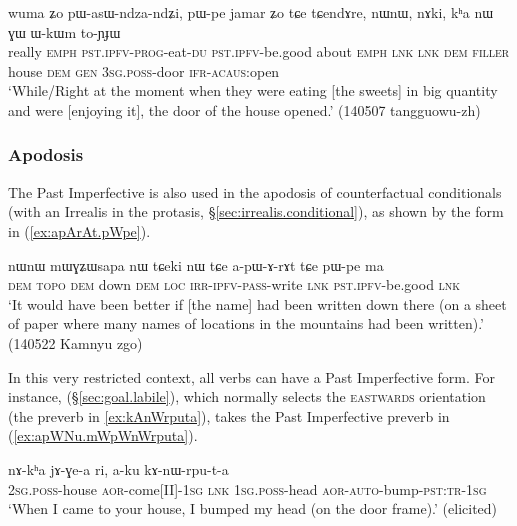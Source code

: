 \begin{exe}
\ex \label{ex:pasWndzandZi.pWpe}
\gll wuma ʑo pɯ-asɯ-ndza-ndʑi,  pɯ-pe jamar ʑo tɕe tɕendɤre, nɯnɯ, nɤki, kʰa nɯ ɣɯ ɯ-kɯm to-ɲɟɯ\\
really \textsc{emph} \textsc{pst}.\textsc{ipfv}-\textsc{prog}-eat-\textsc{du} \textsc{pst}.\textsc{ipfv}-be.good about \textsc{emph} \textsc{lnk} \textsc{lnk} \textsc{dem} \textsc{filler} house \textsc{dem} \textsc{gen} \textsc{3sg}.\textsc{poss}-door \textsc{ifr}-\textsc{acaus}:open\\
\glt `While/Right at the moment when they were eating [the sweets] in big quantity and were [enjoying it], the door of the house opened.' (140507 tangguowu-zh)
\end{exe}

\subsubsection{Apodosis} \label{sec:pst.ifr.ipfv.apodosis}
The Past Imperfective is also used in the apodosis of counterfactual conditionals (with an Irrealis in the protasis, §\ref{sec:irrealis.conditional}), as shown by the form  in (\ref{ex:apArAt.pWpe}).

\begin{exe}
\ex \label{ex:apArAt.pWpe}
\gll nɯnɯ mɯɣʑɯsapa nɯ tɕeki nɯ tɕe a-pɯ-ɤ-rɤt tɕe pɯ-pe ma \\ 
\textsc{dem}  \textsc{topo} \textsc{dem} down \textsc{dem} \textsc{loc} \textsc{irr}-\textsc{ipfv}-\textsc{pass}-write \textsc{lnk} \textsc{pst}.\textsc{ipfv}-be.good \textsc{lnk} \\
\glt `It would have been better if [the name]  had been written down there (on a sheet of paper where many names of locations in the mountains had been written).' (140522  Kamnyu zgo) 
\end{exe}

In this very restricted context, all verbs can have a Past Imperfective form. For instance,  (§\ref{sec:goal.labile}), which normally selects the \textsc{eastwards} orientation (the preverb  in \ref{ex:kAnWrputa}), takes the  Past Imperfective preverb in (\ref{ex:apWNu.mWpWnWrputa}).

\begin{exe}
\ex \label{ex:kAnWrputa}
\gll nɤ-kʰa jɤ-ɣe-a ri, a-ku kɤ-nɯ-rpu-t-a \\
\textsc{2sg}.\textsc{poss}-house \textsc{aor}-come[II]-\textsc{1sg} \textsc{lnk} \textsc{1sg}.\textsc{poss}-head \textsc{aor}-\textsc{auto}-bump-\textsc{pst}:\textsc{tr}-\textsc{1sg} \\
\glt `When I came to your house, I bumped my head (on the door frame).' (elicited)
\end{exe}

